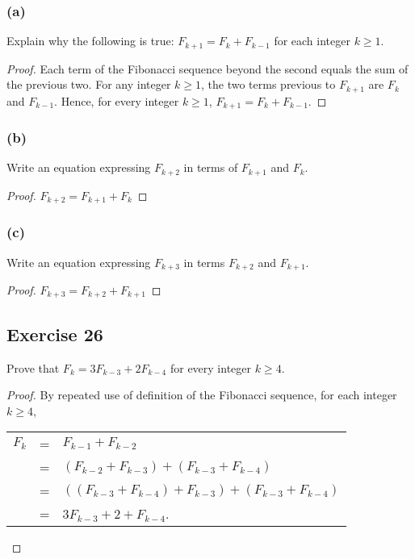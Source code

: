 \documentclass[14pt]{extarticle}
\begin{document}
\subsubsection{(a)}
Explain why the following is true: $F_{k+1} = F_k + F_{k-1}$ for each integer $k \geq 1$.

\begin{proof}
    Each term of the Fibonacci sequence beyond the second equals the sum of the previous two. For any integer
    $k \geq 1$, the two terms previous to $F_{k+1}$ are $F_k$ and $F_{k-1}$. Hence, for every integer $k \geq 1$,
    $F_{k+1} = F_k + F_{k-1}$.
\end{proof}

\subsubsection{(b)}
Write an equation expressing $F_{k+2}$ in terms of $F_{k+1}$ and $F_k$.

\begin{proof}
    $F_{k+2} = F_{k+1} + F_k$
\end{proof}

\subsubsection{(c)}
Write an equation expressing $F_{k+3}$ in terms $F_{k+2}$ and $F_{k+1}$.

\begin{proof}
    $F_{k+3} = F_{k+2} + F_{k+1}$
\end{proof}

\subsection{Exercise 26}
Prove that $F_k = 3F_{k - 3} + 2F_{k - 4}$ for every integer $k \geq 4$.

\begin{proof}
    By repeated use of definition of the Fibonacci sequence,
    for each integer $k \geq 4$,

    \begin{tabular}{rcl}
        $F_k$ & = & $F_{k-1} + F_{k-2}$                                     \\
              & = & $(F_{k-2} + F_{k-3}) + (F_{k-3} + F_{k-4})$             \\
              & = & $((F_{k-3} + F_{k-4}) + F_{k-3}) + (F_{k-3} + F_{k-4})$ \\
              & = & $3F_{k-3} + 2 + F_{k-4}$.
    \end{tabular}

\end{proof}
\end{document}

